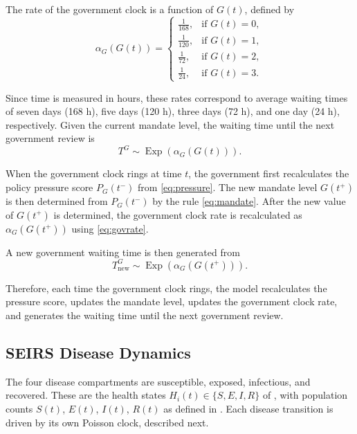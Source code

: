 \documentclass[11pt]{article}
\theoremstyle{definition}
\theoremstyle{plain}
\begin{document}
The rate of the government clock is a function of $G(t)$, defined by
\begin{equation}\label{eq:govrate}
\alpha_G(G(t))=
\begin{cases}
\frac{1}{168}, & \text{if } G(t)=0,\\
\frac{1}{120}, & \text{if } G(t)=1,\\
\frac{1}{72}, & \text{if } G(t)=2,\\
\frac{1}{24}, & \text{if } G(t)=3.
\end{cases}
\end{equation}

Since time is measured in hours, these rates correspond to average waiting times of seven days (168 h), five days (120 h), three days (72 h), and one day (24 h), respectively.
Given the current mandate level, the waiting time until the next government review is
\[
T^{G}\sim\operatorname{Exp}\left(\alpha_G(G(t))\right).
\]

When the government clock rings at time $t$, the government first recalculates the policy pressure score $P_G(t^-)$ from \eqref{eq:pressure}. The new mandate level $G(t^+)$ is then determined from $P_G(t^-)$ by the rule \eqref{eq:mandate}. After the new value of $G(t^+)$ is determined, the government clock rate is recalculated as $\alpha_G(G(t^+))$ using \eqref{eq:govrate}.

A new government waiting time is then generated from
\[
T^{G}_{\mathrm{new}}\sim\operatorname{Exp}\left(\alpha_G(G(t^+))\right).
\]

Therefore, each time the government clock rings, the model recalculates the pressure score, updates the mandate level, updates the government clock rate, and generates the waiting time until the next government review.

\subsection{SEIRS Disease Dynamics}
\label{sec:seirs}


The four disease compartments are susceptible, exposed, infectious, and recovered. These are the health states $H_i(t)\in\{S,E,I,R\}$ of , with population counts $S(t)$, $E(t)$, $I(t)$, $R(t)$ as defined in . Each disease transition is driven by its own Poisson clock, described next.
\end{document}
